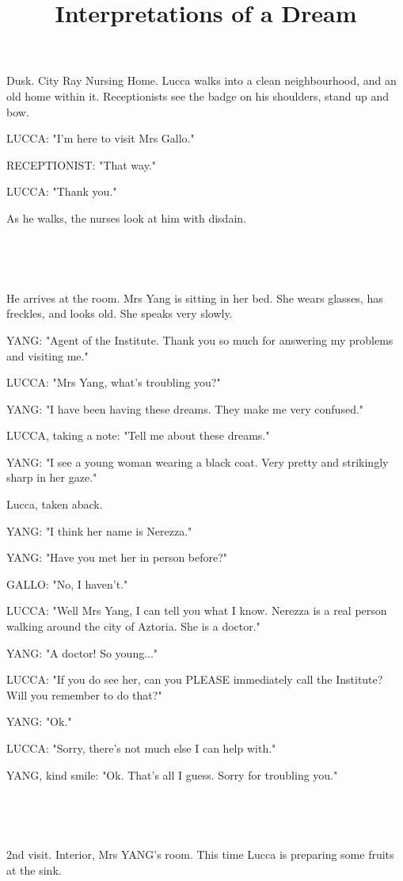 \documentclass[11pt]{article}
\begin{document}
\ttfamily
\title{Interpretations of a Dream}
\maketitle

Dusk. City Ray Nursing Home.
Lucca walks into a clean neighbourhood, and an old home within it.
Receptionists see the badge on his shoulders, stand up and bow. 

LUCCA: "I'm here to visit Mrs Gallo."

RECEPTIONIST: "That way."

LUCCA: "Thank you."

As he walks, the nurses look at him with disdain.

\ 

\ 

He arrives at the room.
Mrs Yang is sitting in her bed.
She wears glasses, has freckles, and looks old.
She speaks very slowly.

YANG: "Agent of the Institute. 
Thank you so much for answering my problems and visiting me."

LUCCA: "Mrs Yang, what's troubling you?"

YANG: "I have been having these dreams.
They make me very confused."

LUCCA, taking a note: "Tell me about these dreams."

YANG: "I see a young woman wearing a black coat.
Very pretty and strikingly sharp in her gaze."

Lucca, taken aback.

YANG: "I think her name is Nerezza."

YANG: "Have you met her in person before?"

GALLO: "No, I haven't."

LUCCA: "Well Mrs Yang, I can tell you what I know.
Nerezza is a real person walking around the city of Aztoria.
She is a doctor."

YANG: "A doctor! 
So young..."

LUCCA: "If you do see her, can you PLEASE immediately call the Institute?
Will you remember to do that?"

YANG: "Ok."

LUCCA: "Sorry, there's not much else I can help with."

YANG, kind smile: "Ok. That's all I guess.
Sorry for troubling you."

\ 

\ 

2nd visit.
Interior, Mrs YANG's room.
This time Lucca is preparing some fruits at the sink.
\end{document}
